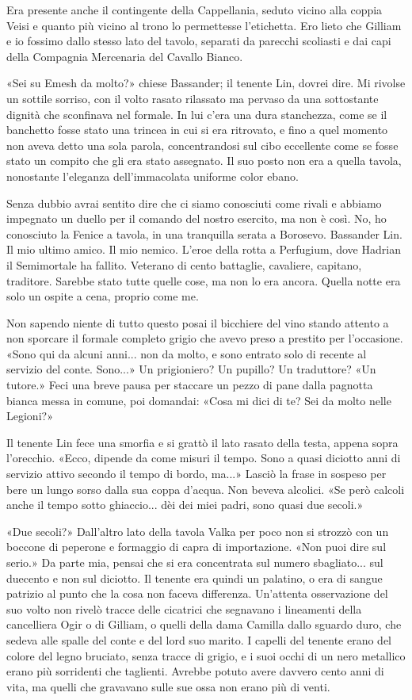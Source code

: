 Era presente anche il contingente della Cappellania, seduto vicino alla
coppia Veisi e quanto più vicino al trono lo permettesse l'etichetta.
Ero lieto che Gilliam e io fossimo dallo stesso lato del tavolo,
separati da parecchi scoliasti e dai capi della Compagnia Mercenaria del
Cavallo Bianco.

«Sei su Emesh da molto?» chiese Bassander; il tenente Lin, dovrei dire.
Mi rivolse un sottile sorriso, con il volto rasato rilassato ma pervaso
da una sottostante dignità che sconfinava nel formale. In lui c'era una
dura stanchezza, come se il banchetto fosse stato una trincea in cui si
era ritrovato, e fino a quel momento non aveva detto una sola parola,
concentrandosi sul cibo eccellente come se fosse stato un compito che
gli era stato assegnato. Il suo posto non era a quella tavola,
nonostante l'eleganza dell'immacolata uniforme color ebano.

Senza dubbio avrai sentito dire che ci siamo conosciuti come rivali e
abbiamo impegnato un duello per il comando del nostro esercito, ma non è
così. No, ho conosciuto la Fenice a tavola, in una tranquilla serata a
Borosevo. Bassander Lin. Il mio ultimo amico. Il mio nemico. L'eroe
della rotta a Perfugium, dove Hadrian il Semimortale ha fallito.
Veterano di cento battaglie, cavaliere, capitano, traditore. Sarebbe
stato tutte quelle cose, ma non lo era ancora. Quella notte era solo un
ospite a cena, proprio come me.

Non sapendo niente di tutto questo posai il bicchiere del vino stando
attento a non sporcare il formale completo grigio che avevo preso a
prestito per l'occasione. «Sono qui da alcuni anni... non da molto, e
sono entrato solo di recente al servizio del conte. Sono...» Un
prigioniero? Un pupillo? Un traduttore? «Un tutore.» Feci una breve
pausa per staccare un pezzo di pane dalla pagnotta bianca messa in
comune, poi domandai: «Cosa mi dici di te? Sei da molto nelle Legioni?»

Il tenente Lin fece una smorfia e si grattò il lato rasato della testa,
appena sopra l'orecchio. «Ecco, dipende da come misuri il tempo. Sono a
quasi diciotto anni di servizio attivo secondo il tempo di bordo, ma...»
Lasciò la frase in sospeso per bere un lungo sorso dalla sua coppa
d'acqua. Non beveva alcolici. «Se però calcoli anche il tempo sotto
ghiaccio... dèi dei miei padri, sono quasi due secoli.»

«Due secoli?» Dall'altro lato della tavola Valka per poco non si strozzò
con un boccone di peperone e formaggio di capra di importazione. «Non
puoi dire sul serio.» Da parte mia, pensai che si era concentrata sul
numero sbagliato... sul duecento e non sul diciotto. Il tenente era
quindi un palatino, o era di sangue patrizio al punto che la cosa non
faceva differenza. Un'attenta osservazione del suo volto non rivelò
tracce delle cicatrici che segnavano i lineamenti della cancelliera Ogir
o di Gilliam, o quelli della dama Camilla dallo sguardo duro, che sedeva
alle spalle del conte e del lord suo marito. I capelli del tenente erano
del colore del legno bruciato, senza tracce di grigio, e i suoi occhi di
un nero metallico erano più sorridenti che taglienti. Avrebbe potuto
avere davvero cento anni di vita, ma quelli che gravavano sulle sue ossa
non erano più di venti.

